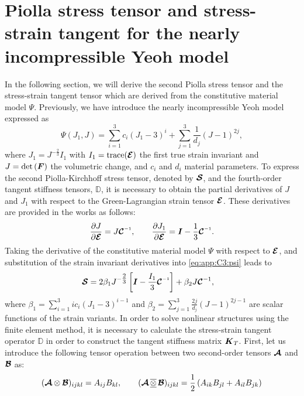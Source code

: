 \section{Piolla stress tensor and stress-strain tangent for the nearly incompressible Yeoh model} 
\label{app:C3:yeohmodel}
In the following section, we will derive the second Piolla stress tensor and the stress-strain tangent tensor which are derived from the constitutive material model $\Psi$. Previously, we have introduce the nearly incompressible Yeoh model expressed as
%
\begin{equation}
\Psi(J_1,J) = \sum_{i = 1}^{3} c_i (J_1 - 3)^i + \sum_{j = 1}^{3} \frac{1}{d_j} (J - 1)^{2j},
\label{eq:app:C3:psi}
\end{equation}
%
where $J_1 = J^{-\tfrac{2}{3}} I_1$ with $I_1 = \text{trace}({\boldsymbol{\mathcal{E}}})$ the first true strain invariant and $J = \textnormal{det}\left( {{\boldsymbol{F}}} \right)$ the volumetric change, and $c_i$ and $d_i$ material parameters. To express the second Piolla-Kirchhoff stress tensor, denoted by $\boldsymbol{\mathcal{S}}$, and the fourth-order tangent stiffness tensors, $\mathbb{D}$, it is necessary to obtain the partial derivatives of $J$ and $J_1$ with respect to the Green-Lagrangian strain tensor $\boldsymbol{\mathcal{E}}$.  These derivatives are provided in the works \cite{Kim2018,Renaud2011} as follows: 
%
\begin{equation}
\frac{\p J}{\p \ten{E}} = J \ten{C}\inv, \quad \quad
\frac{\p J_1}{\p \ten{E}} = \IB - \frac{1}{3} \ten{C}\inv.
\end{equation}
%
Taking the derivative of the constitutive material model $\Psi$ with respect to $\boldsymbol{\mathcal{E}}$, and substitution of the strain invariant derivatives into \eqref{eq:app:C3:psi} leads to 
%
\begin{align}
\ten{S} = 2\beta_{1} J^{-\tfrac{2}{3}}\left[\IB - \frac{I_1}{3}\CT\inv \right] & + \beta_2 J \ten{C}^{-1},
\label{eq:app:C3:secondPiollastress}
\end{align}
%
where $\beta_1 = \sum_{i=1}^3 i {c_i} (J_1 - 3)^{i-1} $ and $\beta_2 = \sum_{j=1}^3 \frac{2j}{d_j} \left(J - 1\right)^{2j - 1}$ are scalar functions of the strain variants. In order to solve nonlinear structures using the finite element method, it is necessary to calculate the stress-strain tangent operator $\mathbb{D}$ in order to construct the tangent stiffness matrix ${\boldsymbol{K}}_T$. First, let us introduce the following tensor operation between two second-order tensors ${\boldsymbol{\mathcal{A}}}$ and ${\boldsymbol{\mathcal{B}}}$ as: 
%
\begin{equation}
({\boldsymbol{\mathcal{A}}} \otimes {\boldsymbol{\mathcal{B}}})_{ijkl} = A_{ij} B_{kl}, \quad \quad ({\boldsymbol{\mathcal{A}}} \,\overline{\underline{\otimes}}\, {\boldsymbol{\mathcal{B}}})_{ijkl} = \frac{1}{2}\left(A_{ik} B_{jl} + A_{il}B_{jk} \right)
\end{equation}
